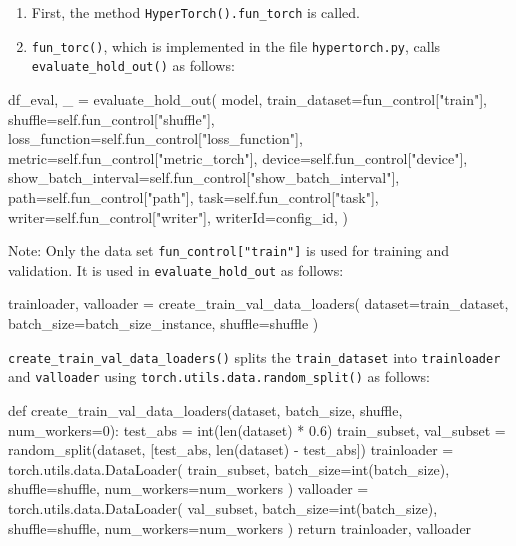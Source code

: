 \documentclass[
  letterpaper,
  DIV=11,
  numbers=noendperiod]{scrreprt}
\newenvironment{Shaded}{\begin{snugshade}}{\end{snugshade}}
\newcommand{\NormalTok}[1]{\textcolor[rgb]{0.00,0.23,0.31}{#1}}
\providecommand{\tightlist}{%
  \setlength{\itemsep}{0pt}\setlength{\parskip}{0pt}}\usepackage{longtable,booktabs,array}
\begin{document}
\begin{enumerate}
\def\labelenumi{\arabic{enumi}.}
\tightlist
\item
  First, the method \texttt{HyperTorch().fun\_torch} is called.
\item
  \texttt{fun\_torc()}, which is implemented in the file
  \texttt{hypertorch.py}, calls \texttt{evaluate\_hold\_out()} as
  follows:
\end{enumerate}

\begin{Shaded}
\begin{Highlighting}[]
\NormalTok{df\_eval, \_ = evaluate\_hold\_out(}
\NormalTok{    model,}
\NormalTok{    train\_dataset=fun\_control["train"],}
\NormalTok{    shuffle=self.fun\_control["shuffle"],}
\NormalTok{    loss\_function=self.fun\_control["loss\_function"],}
\NormalTok{    metric=self.fun\_control["metric\_torch"],}
\NormalTok{    device=self.fun\_control["device"],}
\NormalTok{    show\_batch\_interval=self.fun\_control["show\_batch\_interval"],}
\NormalTok{    path=self.fun\_control["path"],}
\NormalTok{    task=self.fun\_control["task"],}
\NormalTok{    writer=self.fun\_control["writer"],}
\NormalTok{    writerId=config\_id,}
\NormalTok{)}
\end{Highlighting}
\end{Shaded}

Note: Only the data set \texttt{fun\_control{[}"train"{]}} is used for
training and validation. It is used in \texttt{evaluate\_hold\_out} as
follows:

\begin{Shaded}
\begin{Highlighting}[]
\NormalTok{trainloader, valloader = create\_train\_val\_data\_loaders(}
\NormalTok{                dataset=train\_dataset, batch\_size=batch\_size\_instance, shuffle=shuffle}
\NormalTok{            )}
\end{Highlighting}
\end{Shaded}

\texttt{create\_train\_val\_data\_loaders()} splits the
\texttt{train\_dataset} into \texttt{trainloader} and \texttt{valloader}
using \texttt{torch.utils.data.random\_split()} as follows:

\begin{Shaded}
\begin{Highlighting}[]
\NormalTok{def create\_train\_val\_data\_loaders(dataset, batch\_size, shuffle, num\_workers=0):}
\NormalTok{    test\_abs = int(len(dataset) * 0.6)}
\NormalTok{    train\_subset, val\_subset = random\_split(dataset, [test\_abs, len(dataset) {-} test\_abs])}
\NormalTok{    trainloader = torch.utils.data.DataLoader(}
\NormalTok{        train\_subset, batch\_size=int(batch\_size), shuffle=shuffle, num\_workers=num\_workers}
\NormalTok{    )}
\NormalTok{    valloader = torch.utils.data.DataLoader(}
\NormalTok{        val\_subset, batch\_size=int(batch\_size), shuffle=shuffle, num\_workers=num\_workers}
\NormalTok{    )}
\NormalTok{    return trainloader, valloader}
\end{Highlighting}
\end{Shaded}
\end{document}
